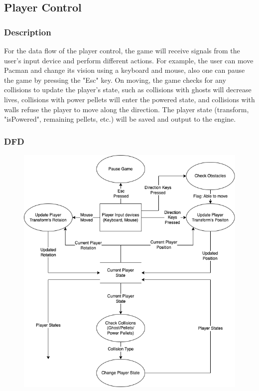 \documentclass[11pt]{article}
\begin{document}
\subsection{Player Control}
\subsubsection{Description}
\par For the data flow of the player control, the game will receive signals from the user's input device and perform different actions. For example, the user can move Pacman and change its vision using a keyboard and mouse, also one can pause the game by pressing the "Esc" key. On moving, the game checks for any collisions to update the player's state, such as collisions with ghosts will decrease lives, collisions with power pellets will enter the powered state, and collisions with walls refuse the player to move along the direction. The player state (transform, "isPowered", remaining pellets, etc.) will be saved and output to the engine.
\subsubsection{DFD}
\begin{figure}[H]
    \centering
    \includegraphics*[scale=0.4]{PlayerControl_DFD.png}
\end{figure}
\end{document}
